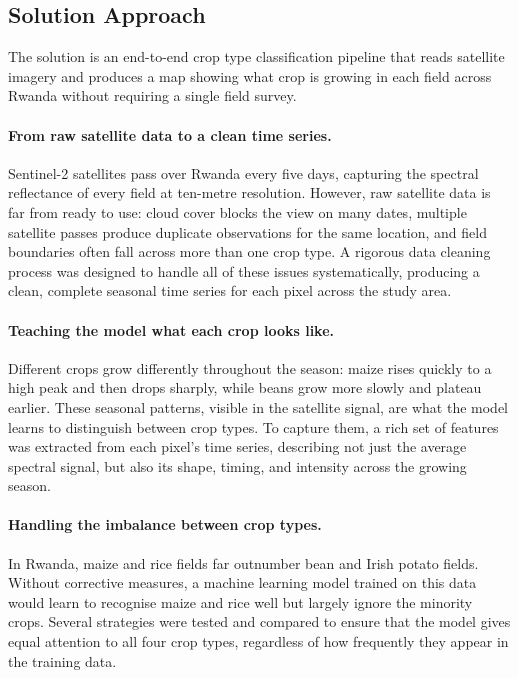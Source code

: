 \subsection{Solution Approach}
\label{sec:intro_sol}

The solution is an end-to-end crop type classification pipeline that
reads satellite imagery and produces a map showing what crop is growing
in each field across Rwanda without requiring a single field survey.

\paragraph{From raw satellite data to a clean time series.}
Sentinel-2 satellites pass over Rwanda every five days, capturing the
spectral reflectance of every field at ten-metre resolution. However,
raw satellite data is far from ready to use: cloud cover blocks the
view on many dates, multiple satellite passes produce duplicate
observations for the same location, and field boundaries often fall
across more than one crop type. A rigorous data cleaning process was
designed to handle all of these issues systematically, producing a
clean, complete seasonal time series for each pixel across the
study area.

\paragraph{Teaching the model what each crop looks like.}
Different crops grow differently throughout the season: maize rises
quickly to a high peak and then drops sharply, while beans grow more
slowly and plateau earlier. These seasonal patterns, visible in the
satellite signal, are what the model learns to distinguish between
crop types. To capture them, a rich set of features was extracted
from each pixel's time series, describing not just the average
spectral signal, but also its shape, timing, and intensity across
the growing season.

\paragraph{Handling the imbalance between crop types.}
In Rwanda, maize and rice fields far outnumber bean and Irish potato
fields. Without corrective measures, a machine learning model trained
on this data would learn to recognise maize and rice well but largely
ignore the minority crops. Several strategies were tested and compared
to ensure that the model gives equal attention to all four crop types,
regardless of how frequently they appear in the training data.

